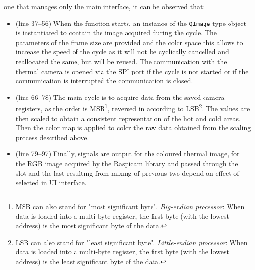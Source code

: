 one that manages only the main interface, it can be observed that:
\begin{itemize}
\item (line 37--56) When the function starts, an instance of the \texttt{QImage}
type object is instantiated to contain the image acquired during the cycle. The
parameters of the frame size are provided and the color space this allows to
increase the speed of the cycle as it will not be cyclically cancelled and
reallocated the same, but will be reused. The communication with the thermal
camera is opened via the SPI port if the cycle is not started or if the
communication is interrupted the communication is closed.
%
\item (line 66--78) The main cycle is to acquire data from the saved camera
registers, as the order is MSB\footnote{MSB can also stand for "most significant
byte". \emph{Big-endian processor}: When data is loaded into a multi-byte
register, the first byte (with the lowest address) is the most significant byte
of the data.\cite{56322}}, reversed in according to LSB\footnote{LSB can also
stand for "least significant byte". \emph{Little-endian processor}: When data is
loaded into a multi-byte register, the first byte (with the lowest address) is
the least significant byte of the data.\cite{56322}}. The values are then scaled
to obtain a consistent representation of the hot and cold areas. Then the color
map is applied to color the raw data obtained from the scaling process described
above.
\item (line 79--97) Finally, signals are output for the coloured thermal image,
for the RGB image acquired by the Raspicam library and passed through the slot
and the last resulting from mixing of previous two depend on effect of selected
in UI interface.
\end{itemize}
